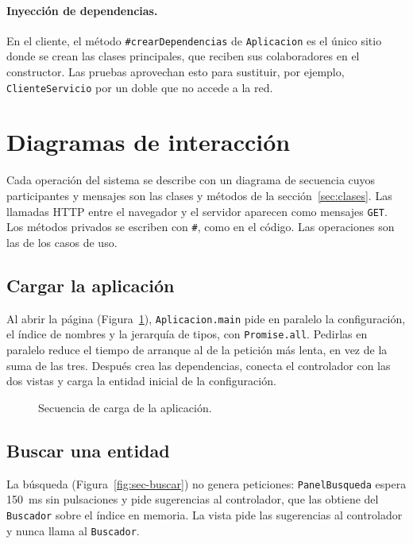 \paragraph{Inyección de dependencias.} En el cliente, el método \texttt{\#crearDependencias} de \texttt{Aplicacion} es el único sitio donde se crean las clases principales, que reciben sus colaboradores en el constructor. Las pruebas aprovechan esto para sustituir, por ejemplo, \texttt{ClienteServicio} por un doble que no accede a la red.

\section{Diagramas de interacción}
\label{sec:interaccion}

Cada operación del sistema se describe con un diagrama de secuencia cuyos participantes y mensajes son las clases y métodos de la sección~\ref{sec:clases}. Las llamadas HTTP entre el navegador y el servidor aparecen como mensajes \texttt{GET}. Los métodos privados se escriben con \texttt{\#}, como en el código. Las operaciones son las de los casos de uso. 

\subsection{Cargar la aplicación}

Al abrir la página (Figura~\ref{fig:sec-cargar}), \texttt{Aplicacion.main} pide en paralelo la configuración, el índice de nombres y la jerarquía de tipos, con \texttt{Promise.all}. Pedirlas en paralelo reduce el tiempo de arranque al de la petición más lenta, en vez de la suma de las tres. Después crea las dependencias, conecta el controlador con las dos vistas y carga la entidad inicial de la configuración.

\begin{figure}[htbp]
  \centering
  \caption{Secuencia de carga de la aplicación.}
  \label{fig:sec-cargar}
\end{figure}

\subsection{Buscar una entidad}

La búsqueda (Figura~\ref{fig:sec-buscar}) no genera peticiones: \texttt{PanelBusqueda} espera 150~ms sin pulsaciones y pide sugerencias al controlador, que las obtiene del \texttt{Buscador} sobre el índice en memoria. La vista pide las sugerencias al controlador y nunca llama al \texttt{Buscador}.

